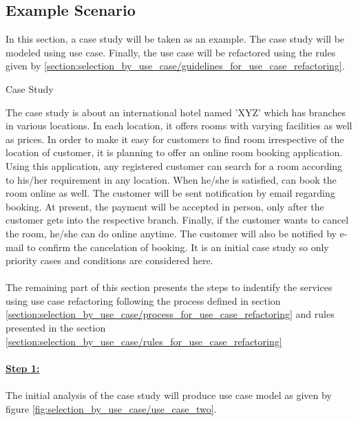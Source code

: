 \subsection{Example Scenario}\label{section:selection_by_use_case/refactoring_example}
In this section, a case study will be taken as an example. The case study will be modeled using use case. Finally, the use case will be refactored using the rules given by \ref{section:selection_by_use_case/guidelines_for_use_case_refactoring}.
\\
\begin{shaded} Case Study \end{shaded}
The case study is about an international hotel named 'XYZ' which has branches in various locations. In each location, it offers rooms with varying facilities as well as prices. In order to make it easy for customers to find room irrespective of the location of customer, it is planning to offer an online room booking application. Using this application, any registered customer can search for a room according to his/her requirement in any location. When he/she is satisfied, can book the room online as well. The customer will be sent notification by email regarding booking. At present, the payment will be accepted in person, only after the customer gets into the respective branch. Finally, if the customer wants to cancel the room, he/she can do online anytime. The customer will also be notified by e-mail to confirm the cancelation of booking. It is an initial case study so only priority cases and conditions are considered here.
\\
\\
The remaining part of this section presents the steps to indentify the services using use case refactoring following the process defined in section \ref{section:selection_by_use_case/process_for_use_case_refactoring} and rules presented in the section \ref{section:selection_by_use_case/rules_for_use_case_refactoring}
\\
\\
\textbf{\underline{Step 1:}}
\\
\\
The initial analysis of the case study will produce use case model as given by figure \ref{fig:selection_by_use_case/use_case_two}.

